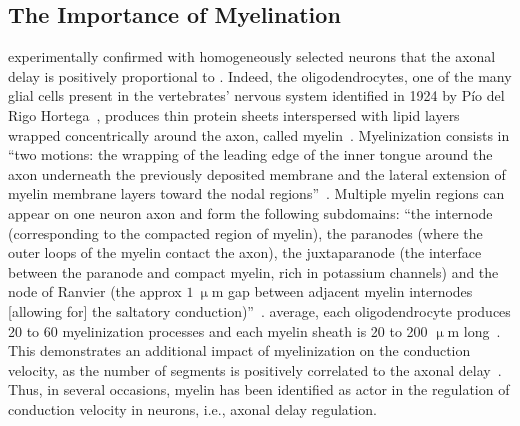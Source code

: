 \documentclass[brainsci, %
               review,accept,pdftex,moreauthors
               ]{Definitions/mdpi}
\begin{document}
\subsection{The Importance of Myelination}
\citet{gasser_axon_1939} experimentally confirmed with homogeneously selected neurons that the axonal delay is positively proportional to . Indeed, the oligodendrocytes, one of the many glial cells present in the vertebrates' nervous system identified in 1924 by Pío del Rigo Hortega~\citep{perez-cerda_pio_2015}, produces thin protein sheets interspersed with lipid layers wrapped concentrically around the axon, called myelin~\citep{schmitt_ultrastructure_1939}. Myelinization consists in ``two motions: the wrapping of the leading edge of the inner tongue around the axon underneath the previously deposited membrane and the lateral extension of myelin membrane layers toward the nodal regions''~\citep{simons_oligodendrocytes_2016}. Multiple myelin regions can appear on one neuron axon and form the following subdomains: ``the internode (corresponding to the compacted region of myelin), the paranodes (where the outer loops of the myelin contact the axon), the juxtaparanode (the interface between the paranode and compact myelin, rich in potassium channels) and the node of Ranvier (the approx $1~\upmu$m gap between adjacent myelin internodes [allowing for] the saltatory conduction)''~\citep{duncan_neuron-oligodendrocyte_2021}.  average, each oligodendrocyte produces 20 to 60 myelinization processes and each myelin sheath is 20 to 200 $\upmu$m long~\citep{simons_oligodendrocytes_2016}. This demonstrates an additional impact of myelinization on the conduction velocity, as the number of segments is positively correlated to the axonal delay~\citep{brill_conduction_1977}. Thus, in several occasions, myelin has been identified as  actor in the regulation of conduction velocity in neurons, i.e., axonal delay regulation.
\end{document}

